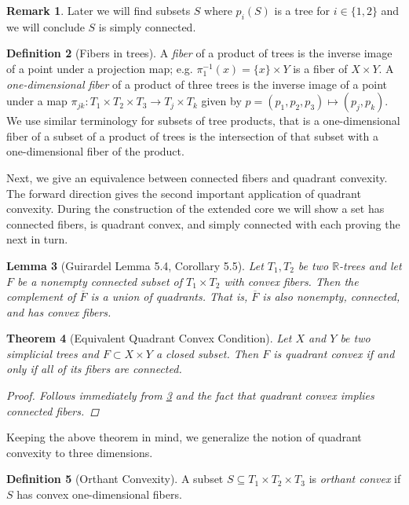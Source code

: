 \documentclass[12pt,parskip=full]{report}
\theoremstyle{plain}
\newtheorem{thm}{Theorem}[section]
\newtheorem{lem}[thm]{Lemma}
\theoremstyle{definition}
\newtheorem{rmk}[thm]{Remark}
\newtheorem{dfn}[thm]{Definition}
\begin{document}
\begin{rmk}
    Later we will find subsets \(S\) where \(p_i(S)\) is a tree for \(i\in\{1,2\}\) and we will conclude \(S\) is simply connected.
\end{rmk}

\begin{dfn}
    [Fibers in trees]
    \label{dfn:treefibers}
    A \emph{fiber} of a product of trees is the inverse image of a point under a projection map; e.g. \( \pi_1^{-1}(x) = \{x\} \times Y\) is a fiber of \(X\times Y\). A \emph{one-dimensional fiber} of a product of three trees is the inverse image of a point under a map \(\pi_{jk}: T_1\times T_2\times T_3 \to T_j\times T_k\) given by \(p = (p_1,p_2,p_3) \mapsto (p_j, p_k)\). We use similar terminology for subsets of tree products, that is a one-dimensional fiber of a subset of a product of trees is the intersection of that subset with a one-dimensional fiber of the product.
\end{dfn}

Next, we give an equivalence between connected fibers and quadrant convexity. The forward direction gives the second important application of quadrant convexity. During the construction of the extended core we will show a set has connected fibers, is quadrant convex, and simply connected with each proving the next in turn.

\begin{lem}
	[Guirardel Lemma 5.4, Corollary 5.5]
    \label{lem:guirardel} 
	Let \(T_{1} , T_{2}\) be two \(\mathbb{R}\)-trees and let \(F\) be a nonempty connected subset of \(T_{1} \times T_{2}\) with convex fibers. Then the complement of \(\overline{F}\) is a union of quadrants. That is, \(\overline{F}\) is also nonempty, connected, and has convex fibers.
\end{lem}

\begin{thm}
    [Equivalent Quadrant Convex Condition]
    \label{thm:guirardelsliceconvex}
    Let \(X\) and \(Y\) be two simplicial trees and \(F\subset X\times Y\) a closed subset. Then \(F\) is quadrant convex if and only if all of its fibers are connected.
    \begin{proof}
        Follows immediately from \ref{lem:guirardel} and the fact that  quadrant convex implies connected fibers.
    \end{proof}
\end{thm}

Keeping the above theorem in mind, we generalize the notion of quadrant convexity to three dimensions.
\begin{dfn}
    [Orthant Convexity]
    A subset \(S\subseteq T_1\times T_2\times T_3\) is \emph{orthant convex} if \(S\) has convex one-dimensional fibers.
\end{dfn}
\end{document}
